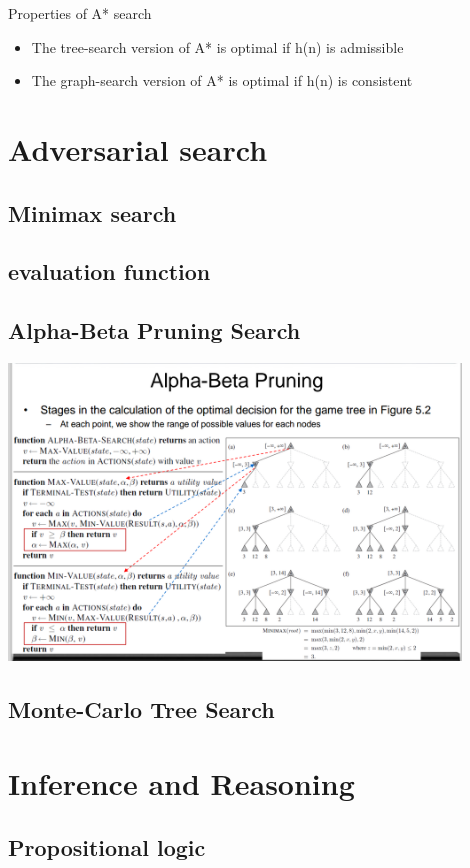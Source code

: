 \documentclass[11pt]{article}
\begin{document}
Properties of A* search
\begin{itemize}
\item The tree-search version of A* is optimal if h(n) is admissible
\item The graph-search version of A* is optimal if h(n) is consistent
\end{itemize}
\section{Adversarial search}
\label{sec:orgb3b53bf}

\subsection{Minimax search}
\label{sec:org984ed28}
\subsection{evaluation function}
\label{sec:org5c4cc77}
\subsection{Alpha-Beta Pruning Search}
\label{sec:org46fdbca}
\includegraphics[width=0.9\textwidth]{ABP}
\subsection{Monte-Carlo Tree Search}
\label{sec:orgbe67a4b}

\section{Inference and Reasoning}
\label{sec:orgf1c1318}
\subsection{Propositional logic}
\label{sec:orgf3f3c91}
\end{document}
